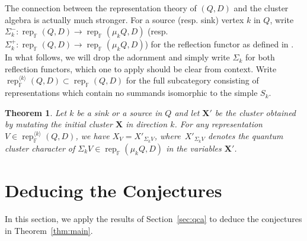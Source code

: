 \documentclass[12pt]{amsart}
\newtheorem{theorem}{Theorem}
\newcommand{\bfX}{\mathbf{X}}
\newcommand{\FF}{\mathbb{F}}
\newcommand{\rep}{\operatorname{rep}}
\begin{document}
  The connection between the representation theory of $(Q,D)$ and the cluster algebra is actually much stronger.
  For a source (resp. sink) vertex $k$ in $Q$, write $\Sigma_k^-:\rep_\FF(Q,D)\to\rep_\FF(\mu_kQ,D)$ (resp. $\Sigma_k^+:\rep_\FF(Q,D)\to\rep_\FF(\mu_kQ,D)$) for the reflection functor as defined in \cite[Sec. 2]{dlab-ringel}.  
  In what follows, we will drop the adornment and simply write $\Sigma_k$ for both reflection functors, which one to apply should be clear from context.
  Write $\rep_\FF^{\langle k\rangle}(Q,D)\subset\rep_\FF(Q,D)$ for the full subcategory consisting of representations which contain no summands isomorphic to the simple $S_k$.
  \begin{theorem}\cite{rupel1}
    \label{th:reflection functor}
    Let $k$ be a sink or a source in $Q$ and let $\bfX'$ be the cluster obtained by mutating the initial cluster $\bfX$ in direction $k$.
    For any representation $V\in\rep_\FF^{\langle k\rangle}(Q,D)$, we have $X_V=X'_{\Sigma_kV}$, where~$X'_{\Sigma_kV}$ denotes the quantum cluster character of $\Sigma_kV\in\rep_\FF(\mu_kQ,D)$ in the variables $\bfX'$.
  \end{theorem}


\section{Deducing the Conjectures}
In this section, we apply the results of Section~\ref{sec:qca} to deduce the conjectures in Theorem~\ref{thm:main}.
\end{document}
